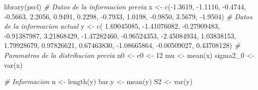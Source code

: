 \documentclass[
  10pt,
  spanish,
]{book}
\newenvironment{Shaded}{\begin{snugshade}}{\end{snugshade}}
\newcommand{\CommentTok}[1]{\textcolor[rgb]{0.56,0.35,0.01}{\textit{#1}}}
\newcommand{\DecValTok}[1]{\textcolor[rgb]{0.00,0.00,0.81}{#1}}
\newcommand{\FloatTok}[1]{\textcolor[rgb]{0.00,0.00,0.81}{#1}}
\newcommand{\FunctionTok}[1]{\textcolor[rgb]{0.00,0.00,0.00}{#1}}
\newcommand{\NormalTok}[1]{#1}
\newcommand{\OtherTok}[1]{\textcolor[rgb]{0.56,0.35,0.01}{#1}}
\newcommand{\SpecialCharTok}[1]{\textcolor[rgb]{0.00,0.00,0.00}{#1}}
\theoremstyle{definition}
\theoremstyle{definition}
\theoremstyle{definition}
\theoremstyle{definition}
\theoremstyle{remark}
\begin{document}
\begin{Shaded}
\begin{Highlighting}[]
\FunctionTok{library}\NormalTok{(pscl)}
\CommentTok{\# Datos de la informacion previa}
\NormalTok{x }\OtherTok{\textless{}{-}} \FunctionTok{c}\NormalTok{(}\SpecialCharTok{{-}}\FloatTok{1.3619}\NormalTok{, }\SpecialCharTok{{-}}\FloatTok{1.1116}\NormalTok{, }\SpecialCharTok{{-}}\FloatTok{0.4744}\NormalTok{, }\SpecialCharTok{{-}}\FloatTok{0.5663}\NormalTok{, }
        \FloatTok{2.2056}\NormalTok{,  }\FloatTok{0.9491}\NormalTok{,  }\FloatTok{0.2298}\NormalTok{, }\SpecialCharTok{{-}}\FloatTok{0.7933}\NormalTok{, }
        \FloatTok{1.0198}\NormalTok{, }\SpecialCharTok{{-}}\FloatTok{0.9850}\NormalTok{,  }\FloatTok{3.5679}\NormalTok{, }\SpecialCharTok{{-}}\FloatTok{1.9504}\NormalTok{)}
\CommentTok{\# Datos de la informacion actual}
\NormalTok{y }\OtherTok{\textless{}{-}} \FunctionTok{c}\NormalTok{( }\FloatTok{1.69045085}\NormalTok{, }\SpecialCharTok{{-}}\FloatTok{1.41076082}\NormalTok{, }\SpecialCharTok{{-}}\FloatTok{0.27909483}\NormalTok{, }
       \SpecialCharTok{{-}}\FloatTok{0.91387987}\NormalTok{,  }\FloatTok{3.21868429}\NormalTok{, }\SpecialCharTok{{-}}\FloatTok{1.47282460}\NormalTok{, }
       \SpecialCharTok{{-}}\FloatTok{0.96524353}\NormalTok{, }\SpecialCharTok{{-}}\FloatTok{2.45084934}\NormalTok{,  }\FloatTok{1.03838153}\NormalTok{, }
        \FloatTok{1.79928679}\NormalTok{,  }\FloatTok{0.97826621}\NormalTok{,  }\FloatTok{0.67463830}\NormalTok{, }
       \SpecialCharTok{{-}}\FloatTok{1.08665864}\NormalTok{, }\SpecialCharTok{{-}}\FloatTok{0.00509027}\NormalTok{,  }\FloatTok{0.43708128}\NormalTok{)}
\CommentTok{\# Paramatros de la distribucion previa}
\NormalTok{n0 }\OtherTok{\textless{}{-}}\NormalTok{ c0 }\OtherTok{\textless{}{-}} \DecValTok{12}
\NormalTok{mu }\OtherTok{\textless{}{-}} \FunctionTok{mean}\NormalTok{(x)}
\NormalTok{sigma2\_0 }\OtherTok{\textless{}{-}} \FunctionTok{var}\NormalTok{(x)}

\CommentTok{\# Informacion}
\NormalTok{n }\OtherTok{\textless{}{-}} \FunctionTok{length}\NormalTok{(y)}
\NormalTok{bar.y }\OtherTok{\textless{}{-}} \FunctionTok{mean}\NormalTok{(y)}
\NormalTok{S2 }\OtherTok{\textless{}{-}} \FunctionTok{var}\NormalTok{(y)}


\end{Highlighting}
\end{Shaded}
\end{document}
